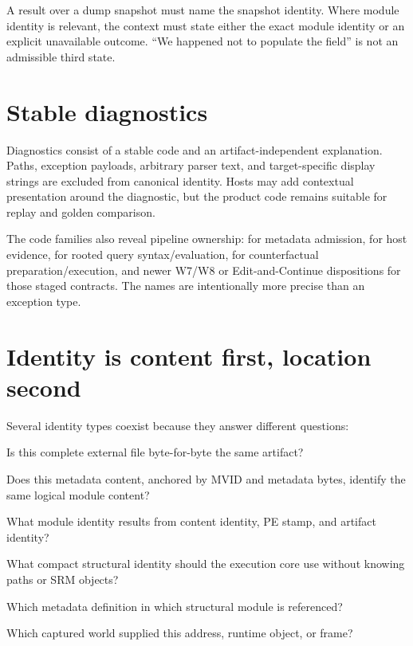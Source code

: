 \documentclass[11pt,oneside,openany]{book}
\newcommand{\typeName}[1]{\texttt{\detokenize{#1}}}
\newcommand{\codeinline}[1]{\texttt{\detokenize{#1}}}
\begin{document}
\begin{invariantbox}
A result over a dump snapshot must name the snapshot identity. Where module identity is relevant, the context must state either the exact module identity or an explicit unavailable outcome. ``We happened not to populate the field'' is not an admissible third state.
\end{invariantbox}

\section{Stable diagnostics}

Diagnostics consist of a stable code and an artifact-independent explanation. Paths, exception payloads, arbitrary parser text, and target-specific display strings are excluded from canonical identity. Hosts may add contextual presentation around the diagnostic, but the product code remains suitable for replay and golden comparison.

The code families also reveal pipeline ownership: \codeinline{META_*} for metadata admission, \codeinline{DUMP_*} for host evidence, \codeinline{QUERY_*} for rooted query syntax/evaluation, \codeinline{W4.*} for counterfactual preparation/execution, and newer W7/W8 or Edit-and-Continue dispositions for those staged contracts. The names are intentionally more precise than an exception type.

\section{Identity is content first, location second}

Several identity types coexist because they answer different questions:

\begin{description}[style=nextline]
  \item[\typeName{ArtifactContentIdentity}] Is this complete external file byte-for-byte the same artifact?
  \item[\typeName{ModuleContentIdentity}] Does this metadata content, anchored by MVID and metadata bytes, identify the same logical module content?
  \item[\typeName{ModuleId}] What module identity results from content identity, PE stamp, and artifact identity?
  \item[\typeName{ModuleHandle}] What compact structural identity should the execution core use without knowing paths or SRM objects?
  \item[\typeName{MethodHandle}/\typeName{FieldHandle}] Which metadata definition in which structural module is referenced?
  \item[Snapshot identity] Which captured world supplied this address, runtime object, or frame?
\end{description}
\end{document}
